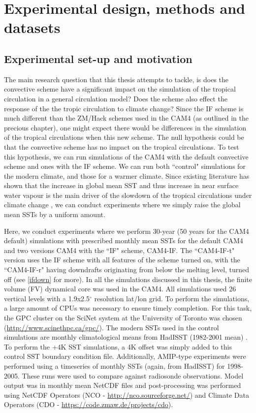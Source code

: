 \documentclass[letterpaper,12pt,titlepage,oneside,final]{book}
\begin{document}
\chapter{Experimental design, methods and datasets}

\section{Experimental set-up and motivation}

The main research question that this thesis attempts to tackle, is does the convective scheme have a significant impact on the simulation of the tropical circulation in a general circulation model? Does the scheme also effect the response of the the tropic circulation to climate change? Since the IF scheme is much different than the ZM/Hack schemes used in the CAM4 (as outlined in the precious chapter), one might expect there would be differences in the simulation of the tropical circulations when this new scheme. The null hypothesis could be that the convective scheme has no impact on the tropical circulations. To test this hypothesis, we can run simulations of the CAM4 with the default convective scheme and ones with the IF scheme. We can run both ``control" simulations for the modern climate, and those for a warmer climate. Since existing literature has shown that the increase in global mean SST and thus increase in near surface water vapour is the main driver of the slowdown of the tropical circulations under climate change \citep{held_robust_2006,ma_mechanisms_2011,vecchi_global_2007,he_anthropogenic_2015}, we can conduct experiments where we simply raise the global mean SSTs by a uniform amount.

Here, we conduct experiments where we perform 30-year (50 years for the CAM4 default) simulations with prescribed monthly mean SSTs for the default CAM4 and two versions CAM4 with the ``IF" scheme, CAM4-IF. The ``CAM4-IF-t" version uses the IF scheme with all features of the scheme turned on, with the ``CAM4-IF-r" having downdrafts originating from below the melting level, turned off (see \ref{ifdown} for more). In all the simulations discussed in this thesis, the finite volume (FV) dynamical core was used in the CAM4. All simulations used 26 vertical levels with a 1.9x2.5$^{\circ}$ resolution lat/lon grid. To perform the simulations, a large amount of CPUs was necessary to ensure timely completion. For this task, the GPC cluster on the SciNet system at the University of Toronto was chosen (\url{http://www.scinethpc.ca/gpc/}). The modern SSTs used in the control simulations are monthly climatological means from HadISST (1982-2001 mean) \citep{hurrell_new_2008}. To perform the +4K SST simulations, a 4K offset was simply added to this control SST boundary condition file. Additionally, AMIP-type experiments \citep{taylor_overview_2011} were performed using a timeseries of monthly SSTs (again, from HadISST) for 1998-2005. These runs were used to compare against radiosonde observations. Model output was in monthly mean NetCDF files and post-processing was performed using NetCDF Operators (NCO - \url{http://nco.sourceforge.net/}) and Climate Data Operators (CDO - \url{https://code.zmaw.de/projects/cdo}).
\end{document}
